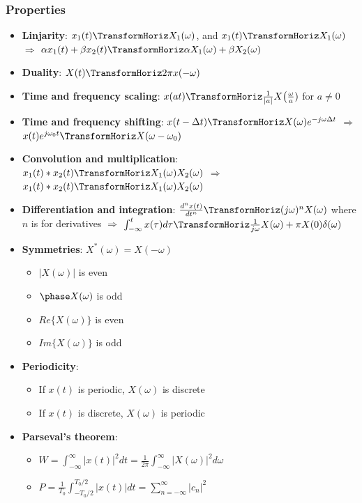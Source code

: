 \documentclass{article}
\begin{document}
\subsubsection{Properties}
\begin{itemize}
    \item \textbf{Linjarity}: $x_1(t) \TransformHoriz X_1(\omega)$, and
     $x_1(t) \TransformHoriz X_1(\omega)$ $\Rightarrow$
     $\alpha x_1(t) + \beta x_2(t) \TransformHoriz \alpha X_1(\omega) + \beta X_2(\omega)$
    \item \textbf{Duality}: $X(t) \TransformHoriz 2\pi x(-\omega)$
    \item \textbf{Time and frequency scaling}: $x(at) \TransformHoriz \frac{1}{|a|}X\big(\frac{\omega}{a})$ for $a\neq0$
    \item \textbf{Time and frequency shifting}: $x(t-\Delta t) \TransformHoriz X(\omega)e^{-j\omega\Delta t}$
    $\Rightarrow$ $x(t)e^{j\omega_0 t} \TransformHoriz X(\omega-\omega_0)$
    \item \textbf{Convolution and multiplication}: $x_1(t)*x_2(t) \TransformHoriz X_1(\omega)X_2(\omega)$ 
    $\Rightarrow$ $x_1(t)*x_2(t) \TransformHoriz X_1(\omega)X_2(\omega)$
    \item \textbf{Differentiation and integration}: $\frac{d^nx(t)}{dt^n} \TransformHoriz (j\omega)^n X(\omega)$ 
    where $n$ is for derivatives \newline
    $\Rightarrow$ $\int_{-\infty}^t x(\tau)d\tau \TransformHoriz \frac{1}{j\omega} X(\omega) + \pi X(0)\delta(\omega)$
    \item \textbf{Symmetries}: $X^*(\omega) = X(-\omega)$
    \begin{itemize}
        \item $|X(\omega)|$ is even
        \item $\phase X(\omega)$ is odd
        \item $Re\{X(\omega)\}$ is even
        \item $Im\{X(\omega)\}$ is odd
    \end{itemize}
    \item \textbf{Periodicity}:
    \begin{itemize}
        \item If $x(t)$ is periodic, $X(\omega)$ is discrete
        \item If $x(t)$ is discrete, $X(\omega)$ is periodic
    \end{itemize}
    \item \textbf{Parseval's theorem}: 
    \begin{itemize}
        \item $W=\int_{-\infty}^{\infty} |x(t)|^2 dt = \frac{1}{2\pi} \int_{-\infty}^{\infty} |X(\omega)|^2d\omega$ \newline
        \item $P=\frac{1}{T_0}\int_{-T_0/2}^{T_0/2} |x(t)|dt = \sum_{n=-\infty}^{\infty} |c_n|^2$
    \end{itemize}
\end{itemize}
\end{document}
